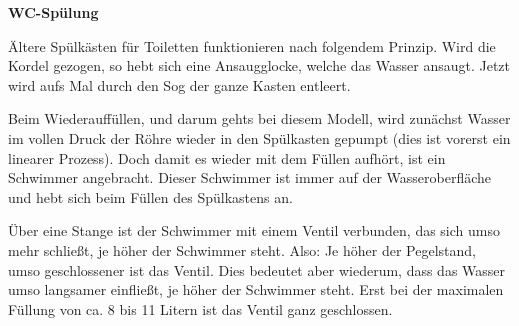 
\bbwActAufgabenNr{} \textbf{WC-Spülung}\par
Ältere Spülkästen für Toiletten funktionieren nach folgendem Prinzip.
Wird die Kordel gezogen, so hebt sich eine
Ansaugglocke, welche das Wasser ansaugt. Jetzt wird aufs Mal durch den
Sog der ganze Kasten entleert.

Beim Wiederauffüllen, und darum gehts bei diesem Modell, wird zunächst
Wasser im vollen Druck der Röhre wieder in den Spülkasten
gepumpt (dies ist vorerst ein linearer Prozess). Doch damit es wieder mit dem Füllen aufhört,
ist ein Schwimmer angebracht. Dieser Schwimmer ist immer auf der
Wasseroberfläche und hebt sich beim Füllen des Spülkastens an.

Über eine Stange ist der Schwimmer
mit einem Ventil verbunden, das sich umso mehr schließt, je höher der
Schwimmer steht. Also: Je höher der Pegelstand, umso geschlossener ist
das Ventil. Dies bedeutet aber wiederum, dass das Wasser umso
langsamer einfließt, je höher der Schwimmer steht. Erst bei der
maximalen Füllung von ca. 8 bis 11 Litern ist das Ventil ganz
geschlossen. 

